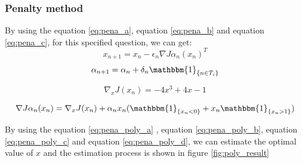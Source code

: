 \documentclass[a4paper,12pt]{article}
\begin{document}
\subsubsection{Penalty method }
 By using the equation \ref{eq:pena_a}, equation \ref{eq:pena_b} and equation \ref{eq:pena_c}, for this specified question, we can get:\\
\begin{equation} \label{eq:pena_poly_a}
x_{n+1}=x_n-\epsilon _n \nabla J{\alpha_ n}(x_n)^T
\end{equation}
\begin{equation}\label{eq:pena_poly_b}
\alpha_{n+1}=\alpha_n+\delta _n \mathbbm{1} _{\{n\in {T_i}\}}
\end{equation}

\begin{equation}\label{eq:pena_poly_c}
\nabla _x J(x_n) = -4x^3+4x-1
\end{equation}

\begin{equation}\label{eq:pena_poly_d}
\nabla J{\alpha_ n}(x_n) =\nabla _x J(x_n)+\alpha_n x_n( \mathbbm{1}_{\{x_n<0\}}+ x_n \mathbbm{1}_{\{x_n>1\}})
\end{equation}

By using the equation \ref{eq:pena_poly_a} , equation \ref{eq:pena_poly_b},  equation \ref{eq:pena_poly_c}  and equation \ref{eq:pena_poly_d}, we can estimate the optimal value of $x$ and the estimation process is shown in figure \ref{fig:poly_result}\\
\end{document}
